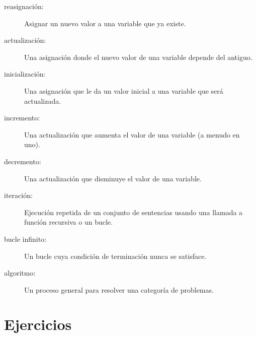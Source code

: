 \documentclass[10pt]{book}
\begin{document}
\begin{description}

\item[reasignación:] Asignar un nuevo valor a una variable que
ya existe.

\item[actualización:] Una asignación donde el nuevo valor de una variable
depende del antiguo.

\item[inicialización:] Una asignación que le da un valor inicial a
una variable que será actualizada.

\item[incremento:] Una actualización que aumenta el valor de una variable
(a menudo en uno).

\item[decremento:] Una actualización que disminuye el valor de una variable.

\item[iteración:] Ejecución repetida de un conjunto de sentencias usando
una llamada a función recursiva o un bucle.

\item[bucle infinito:] Un bucle cuya condición de terminación nunca
se satisface.

\item[algoritmo:]  Un proceso general para resolver una categoría de
problemas.

\end{description}


\section{Ejercicios}
\end{document}
